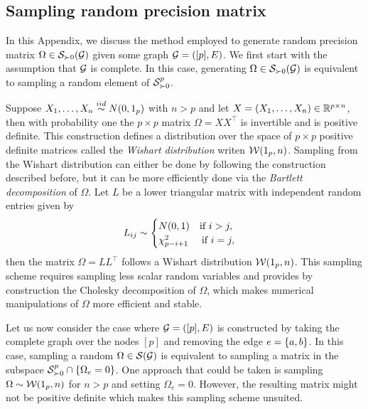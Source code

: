 \subsection{Sampling random precision matrix}

In this Appendix, we discuss the method employed to generate random precision matrix $\Omega \in \S_{\succ 0}(\G)$ given some graph $\G = ([p], E)$. We first start with the assumption that $\G$ is complete. In this case, generating $\Omega \in \S_{\succ 0}(\G)$ is equivalent to sampling a random element of $\S^p_{\succ 0}$. 

Suppose $X_1, \ldots, X_n \simiid N(0, 1_p)$ with $n > p$ and let $X = (X_1, \ldots, X_n) \in \R^{p\times n}$, then with probability one the $p \times p$ matrix $\Omega = XX^\top$ is invertible and is positive definite. This construction defines a distribution over the space of $p \times p$ positive definite matrices called the \textit{Wishart distribution} writen $\c{W}(1_p, n)$. Sampling from the Wishart distribution can either be done by following the construction described before, but it can be more efficiently done via the \textit{Bartlett decomposition} \cite{10.2307/2346290} of $\Omega$. Let $L$ be a lower triangular matrix with independent random entries given by
\begin{equation*}
    L_{ij} \sim \begin{cases}
        N(0, 1) \ \ \t{ if } i > j,\\
        \chi^2_{p - i + 1} \ \ \ \t{ if } i = j,
    \end{cases}
\end{equation*}
then the matrix $\Omega = L L^\top$ follows a Wishart distribution $\c{W}(1_p, n)$. This sampling scheme requires sampling less scalar random variables and provides by construction the Cholesky decomposition of $\Omega$, which makes numerical manipulations of $\Omega$ more efficient and stable.

Let us now consider the case where $\G = ([p], E)$ is constructed by taking the complete graph over the nodes $[p]$ and removing the edge $e = \eset{a, b}$. In this case, sampling a random $\Omega \in \S(\G)$ is equivalent to sampling a matrix in the subspace $\S^p_{\succ 0} \cap \eset{ \Omega_e = 0}$. One approach that could be taken is sampling $\Omega \sim \c{W}(1_p, n)$ for $n > p$ and setting $\Omega_e = 0$. However, the resulting matrix might not be positive definite which makes this sampling scheme unsuited.

